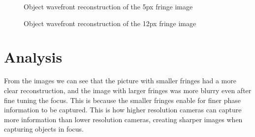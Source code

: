 \documentclass[12pt,a4paper,english
]{tunithesis}
\begin{document}
\begin{figure}
  \centering
  \caption{Object wavefront reconstruction of the 5px fringe image}
   \label{fig:5px}
\end{figure}


\begin{figure}
  \centering
  \caption{Object wavefront reconstruction of the 12px fringe image}
    \label{fig:12px}
\end{figure}

\section{Analysis}
From the images we can see that the picture with smaller fringes had a more clear reconstruction, and the image with larger fringes was more blurry even after fine tuning the focus. This is because the smaller fringes enable for finer phase information to be captured. This is how higher resolution cameras can capture more information than lower resolution cameras, creating sharper images when capturing objects in focus.
\end{document}
